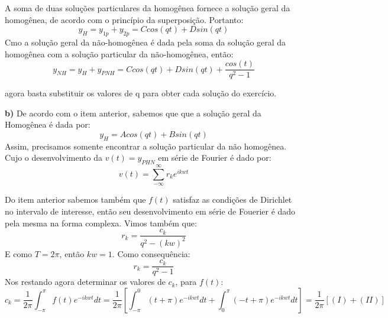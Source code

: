 A soma de duas soluções particulares da homogênea fornece a solução geral da homogênea, de acordo com o princípio da superposição. Portanto:
\begin{equation*}
    y_H = y_{1p} + y_{2p} = Ccos(qt) + Dsin(qt)
\end{equation*}
Cmo a solução geral da não-homogênea é dada pela soma da solução geral da homogênea com a solução particular da não-homogênea, então:
\begin{equation*}
    \boxed{y_{NH} = y_H + y_{PNH} = Ccos(qt) + Dsin(qt) + \frac{cos(t)}{q^2-1}}
\end{equation*}

agora basta substituir os valores de q para obter cada solução do exercício.

\textbf{b)} De acordo com o item anterior, sabemos que que a solução geral da Homogênea é dada por:
\begin{equation*}
    y_H = Acos(qt) + Bsin(qt)
\end{equation*}
Assim, precisamos somente encontrar a solução particular da não homogênea. Cujo o desenvolvimento da $v(t) = y_{PHN}$ em série de Fourier é dado por:
\begin{equation*}
    v(t) = \sum^\infty_{-\infty} r_k e^{ikwt}
\end{equation*}

Do item anterior sabemos também que $f(t)$ satisfaz as condições de Dirichlet no intervalo de interesse, então seu desenvolvimento em série de Fouerier é dado pela mesma na forma complexa. Vimos também que:
\begin{equation*}
    r_k = \frac{c_k}{q^2 - (kw)^2}
\end{equation*}
E como $T=2\pi$, então $kw=1$. Como consequência:
\begin{equation*}
    r_k = \frac{c_k}{q^2 - 1}
\end{equation*}
Nos restando agora determinar os valores de $c_k$, para $f(t)$:
\begin{equation*}
    c_k = \frac{1}{2\pi}\int^\pi_{-\pi} f(t)e^{-ikwt}dt =  \frac{1}{2\pi}\left[\int^0_{-\pi} (t+\pi)e^{-ikwt}dt + \int^\pi_0 (-t+\pi)e^{-ikwt}dt \right]= \frac{1}{2\pi}[(I) + (II)]
\end{equation*}

